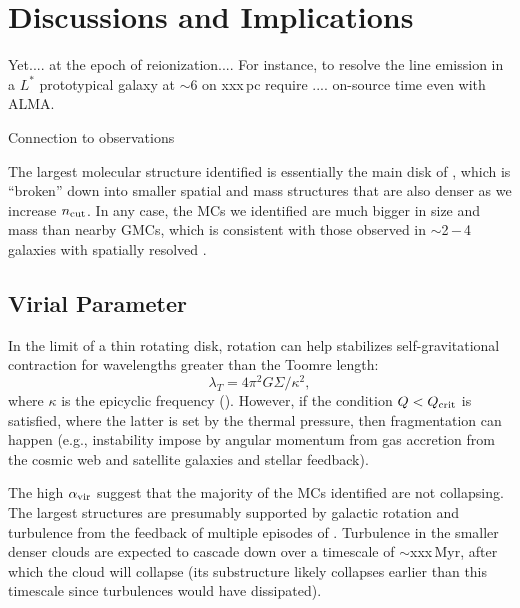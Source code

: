 \documentclass[apj]{emulateapj} %
\begin{document}
\section{Discussions and Implications}     \label{sec:diss}
Yet.... at the epoch of reionization.... For instance, to resolve the 
\aco line emission in a $L^*$ prototypical galaxy at \z$\sim$6 on xxx\,pc 
require .... on-source time even with ALMA. 

Connection to observations

The largest molecular structure identified is essentially the main disk of \flower, which is ``broken'' down into smaller 
spatial and mass structures that are also denser as we increase $n_{\rm cut}$. In any case,
the MCs we identified are much bigger in size and mass than nearby GMCs, which is consistent with 
those observed in \z$\sim$2\,$-$\,4 galaxies with spatially resolved \obs.

\subsection{Virial Parameter}
In the limit of a thin rotating disk, rotation can help stabilizes self-gravitational contraction for wavelengths greater than the Toomre length:
\begin{equation}
\lambda_T = 4\pi^2 G\Sigma/\kappa^2,
\end{equation} 
where $\kappa$ is the epicyclic frequency (\citealt{Toomre64a}).
However, if the condition $Q<Q_{\rm crit}$ is satisfied, where the latter is set by 
the thermal pressure, then fragmentation can happen 
(e.g., instability impose by angular momentum from gas accretion from the cosmic web and 
satellite galaxies and stellar feedback).

The high $\alpha_{\rm vir}$ suggest that the majority of the MCs identified are not collapsing. 
The largest structures are presumably supported by galactic rotation and turbulence from the feedback of 
multiple episodes of \SF.
Turbulence in the smaller denser clouds are expected to cascade down over a timescale of $\sim$xxx\,Myr, after which the cloud will collapse 
(its substructure likely collapses earlier than this timescale since turbulences would have dissipated). 
\end{document}

